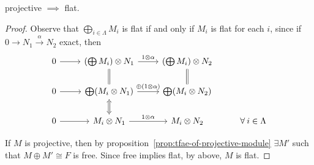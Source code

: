 \begin{prop}
  projective $\implies$ flat.
  \begin{proof}
    Observe that $\bigoplus\limits_{i \in \Lambda} M_i$ is flat if and only if $M_i$ is
    flat for each $i$, since if $0 \to N_1 \xrightarrow{\alpha} N_2$ exact, then
    \[
      \begin{tikzcd} [cong/.style = {draw=none, "\cong" description, sloped}]
        0 \ar[r] & \left( \bigoplus M_i \right) \otimes N_1
        \ar[r, "1 \otimes \alpha"] \ar[d,equal] &
        \left(\bigoplus M_i \right) \otimes N_2 \ar[d, equal] \\
        0 \ar[r] & \bigoplus (M_i \otimes N_1)
        \ar[r, "\oplus (1 \otimes \alpha)"] \ar[d, Leftrightarrow]& 
        \bigoplus (M_i \otimes N_2)\\
        0 \ar[r] & M_i \otimes N_1 \ar[r, "1 \otimes \alpha"] 
        & M_i \otimes N_2 & \forall i \in \Lambda 
      \end{tikzcd}
    \]

    If $M$ is projective, then by proposition~\ref{prop:tfae-of-projective-module}
    $\exists M'$ such that $M \oplus M' \cong F$ is free.
    Since free implies flat, by above, $M$ is flat.
  \end{proof}
\end{prop}

